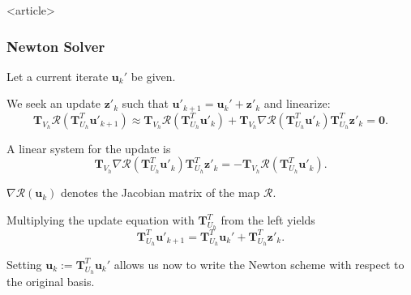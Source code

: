 \begin{frame}<article>
\frametitle<presentation>{Newton Solver}
Let a current iterate $\mathbf{u}_k'$ be given.

We seek an update $\mathbf{z}'_k$ such that $\mathbf{u}'_{k+1} = \mathbf{u}_k'
+ \mathbf{z}'_k$ and linearize:
\begin{equation*}
\mathbf{T}_{V_h}\mathcal{R}\left(\mathbf{T}^T_{U_h}\mathbf{u}'_{k+1}\right) \approx
\mathbf{T}_{V_h}\mathcal{R}\left(\mathbf{T}^T_{U_h}\mathbf{u}'_{k}\right) +
\mathbf{T}_{V_h}\nabla\mathcal{R}\left(\mathbf{T}^T_{U_h}\mathbf{u}'_{k}\right)
\mathbf{T}^T_{U_h} \mathbf{z}'_{k} = \mathbf{0} .
\end{equation*}

A linear system for the update is
\begin{equation}\label{eq:UnconstrainedUpdate}
\mathbf{T}_{V_h}\nabla\mathcal{R}\left(\mathbf{T}^T_{U_h}\mathbf{u}'_{k}\right)
\mathbf{T}^T_{U_h} \mathbf{z}'_{k} = -
\mathbf{T}_{V_h}\mathcal{R}\left(\mathbf{T}^T_{U_h}\mathbf{u}'_{k}\right) .
\end{equation}

$\nabla\mathcal{R}\left(\mathbf{u}_{k}\right)$ denotes the
Jacobian matrix of the map $\mathcal{R}$.

Multiplying the update equation with $\mathbf{T}^T_{U_h}$ from the left yields
\begin{equation}\label{eq:OriginalUpdate}
\mathbf{T}^T_{U_h}\mathbf{u}'_{k+1} = \mathbf{T}^T_{U_h}\mathbf{u}_k' +
\mathbf{T}^T_{U_h}\mathbf{z}'_k .
\end{equation}

Setting $\mathbf{u}_{k} := \mathbf{T}^T_{U_h}\mathbf{u}_k'$ allows us
now to write the Newton scheme with respect to the original basis.
\end{frame}


